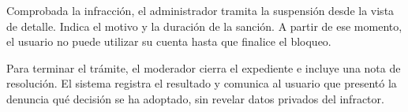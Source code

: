 Comprobada la infracción, el administrador tramita la suspensión desde la vista de detalle. Indica el motivo y la duración de la sanción. A partir de ese momento, el usuario no puede utilizar su cuenta hasta que finalice el bloqueo.

Para terminar el trámite, el moderador cierra el expediente e incluye una nota de resolución. El sistema registra el resultado y comunica al usuario que presentó la denuncia qué decisión se ha adoptado, sin revelar datos privados del infractor.